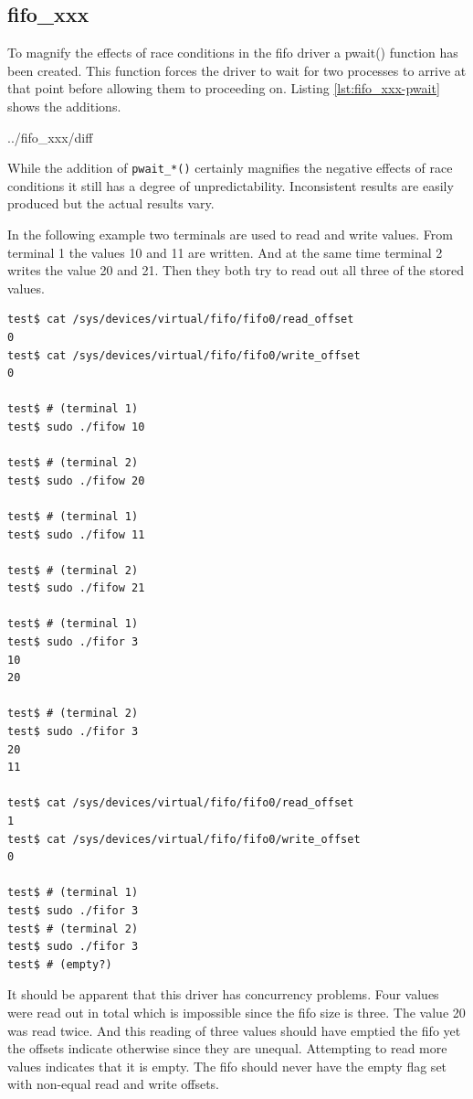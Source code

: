 \documentclass{article}
\begin{document}
\subsection{fifo\_xxx}

To magnify the effects of race conditions in the fifo driver
a pwait() function has been created.
This function forces the driver to wait for two processes
to arrive at that point before allowing them to proceeding on.
Listing \ref{lst:fifo_xxx-pwait} shows the additions.


	{../fifo_xxx/diff}

\begin{samepage}
While the addition of \verb+pwait_*()+ certainly magnifies the negative
effects of race conditions it still has a degree of unpredictability.
Inconsistent results are easily produced but the actual results vary.

In the following example two terminals are used to read and write values.
From terminal 1 the values 10 and 11 are written.
And at the same time terminal 2 writes the value 20 and 21.
Then they both try to read out all three of the stored values.

\begin{verbatim}
test$ cat /sys/devices/virtual/fifo/fifo0/read_offset
0
test$ cat /sys/devices/virtual/fifo/fifo0/write_offset
0

test$ # (terminal 1)
test$ sudo ./fifow 10

test$ # (terminal 2)
test$ sudo ./fifow 20

test$ # (terminal 1)
test$ sudo ./fifow 11

test$ # (terminal 2)
test$ sudo ./fifow 21

test$ # (terminal 1)
test$ sudo ./fifor 3
10
20

test$ # (terminal 2)
test$ sudo ./fifor 3
20
11

test$ cat /sys/devices/virtual/fifo/fifo0/read_offset
1
test$ cat /sys/devices/virtual/fifo/fifo0/write_offset
0

test$ # (terminal 1)
test$ sudo ./fifor 3
test$ # (terminal 2)
test$ sudo ./fifor 3
test$ # (empty?)

\end{verbatim}

It should be apparent that this driver has concurrency problems.
Four values were read out in total which is impossible since
the fifo size is three.
The value 20 was read twice.
And this reading of three values should have emptied the fifo
yet the offsets indicate otherwise since they are unequal.
Attempting to read more values indicates that it is empty.
The fifo should never have the empty flag set with non-equal
read and write offsets.
\end{samepage}
\end{document}
